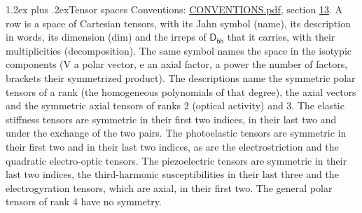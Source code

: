 \documentclass[10pt,a4paper]{article}
\makeatletter
\renewcommand\section{\@startsection{section}{1}{\z@}{-3ex plus -1ex minus -.2ex}%
  {1.2ex plus .2ex}{\normalfont\large\sffamily\bfseries\color{parttitle}}}
\numberwithin{equation}{section}
\newcommand{\grp}[1]{\mathsf{#1}}
\makeatother
\begin{document}
\section{Tensor spaces}\label{s:tensor_spaces}
Conventions: \href{../../CONVENTIONS.pdf}{CONVENTIONS.pdf}, section \href{../../CONVENTIONS.pdf\#conv.13}{13}.
\leavevmode\label{n:head.name}\label{n:head.description}\label{n:head.dim}\label{n:head.decomposition}A row is a space of Cartesian tensors, with its Jahn symbol (name), its description in words, its dimension (dim) and the irreps of $\grp{D_{6h}}$ that it carries, with their multiplicities (decomposition). \label{n:label.jahn}The same symbol names the space in the isotypic components (V a polar vector, e an axial factor, a power the number of factors, brackets their symmetrized product). The descriptions name the symmetric polar tensors of a rank (the homogeneous polynomials of that degree), the axial vectors and the symmetric axial tensors of ranks 2 (optical activity) and 3. The elastic stiffness tensors are symmetric in their first two indices, in their last two and under the exchange of the two pairs. The photoelastic tensors are symmetric in their first two and in their last two indices, as are the electrostriction and the quadratic electro-optic tensors. The piezoelectric tensors are symmetric in their last two indices, the third-harmonic susceptibilities in their last three and the electrogyration tensors, which are axial, in their first two. The general polar tensors of rank 4 have no symmetry.
\end{document}
